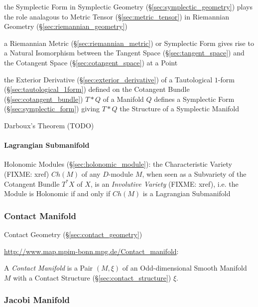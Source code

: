 the Symplectic Form in Symplectic Geometry (\S\ref{sec:symplectic_geometry})
plays the role analagous to Metric Tensor (\S\ref{sec:metric_tensor}) in
Riemannian Geometry (\S\ref{sec:riemannian_geometry})

a Riemannian Metric (\S\ref{sec:riemannian_metric}) or Symplectic Form gives
rise to a Natural Isomorphism between the Tangent Space
(\S\ref{sec:tangent_space}) and the Cotangent Space
(\S\ref{sec:cotangent_space}) at a Point

the Exterior Derivative (\S\ref{sec:exterior_derivative}) of a Tautological
$1$-form (\S\ref{sec:tautological_1form}) defined on the Cotangent Bundle
(\S\ref{sec:cotangent_bundle}) $T *
Q$ of a Manifold $Q$ defines a Symplectic Form (\S\ref{sec:symplectic_form})
giving $T * Q$ the Structure of a Symplectic Manifold

Darboux's Theorem (TODO)



\paragraph{Lagrangian Submanifold}\label{sec:lagrangian_submanifold}\hfill

\fist Holonomic Modules (\S\ref{sec:holonomic_module}): the Characteristic
Variety (FIXME: xref) $Ch(M)$ of any $D$-module $M$, when seen as a Subvariety
of the Cotangent Bundle $T^*X$ of $X$, is an \emph{Involutive Variety} (FIXME:
xref), i.e. the Module is Holonomic if and only if $Ch(M)$ is a Lagrangian
Submanifold



\subsubsection{Contact Manifold}\label{sec:contact_manifold}

\fist Contact Geometry (\S\ref{sec:contact_geometry})

\url{http://www.map.mpim-bonn.mpg.de/Contact_manifold}:

A \emph{Contact Manifold} is a Pair $(M,\xi)$ of an Odd-dimensional Smooth
Manifold $M$ with a Contact Structure (\S\ref{sec:contact_structure}) $\xi$.



\subsubsection{Jacobi Manifold}\label{sec:jacobi_manifold}

